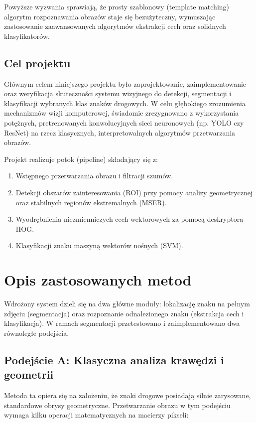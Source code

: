 \documentclass[12pt,a4paper]{article}
\begin{document}
Powyższe wyzwania sprawiają, że prosty szablonowy (template matching) algorytm rozpoznawania obrazów staje się bezużyteczny, wymuszając zastosowanie zaawansowanych algorytmów ekstrakcji cech oraz solidnych klasyfikatorów.

\subsection{Cel projektu}
Głównym celem niniejszego projektu było zaprojektowanie, zaimplementowanie oraz weryfikacja skuteczności systemu wizyjnego do detekcji, segmentacji i klasyfikacji wybranych klas znaków drogowych. W celu głębokiego zrozumienia mechanizmów wizji komputerowej, świadomie zrezygnowano z wykorzystania potężnych, pretrenowanych konwolucyjnych sieci neuronowych (np. YOLO czy ResNet) na rzecz klasycznych, interpretowalnych algorytmów przetwarzania obrazów. 

Projekt realizuje potok (pipeline) składający się z:
\begin{enumerate}
    \item Wstępnego przetwarzania obrazu i filtracji szumów.
    \item Detekcji obszarów zainteresowania (ROI) przy pomocy analizy geometrycznej oraz stabilnych regionów ekstremalnych (MSER).
    \item Wyodrębnienia niezmienniczych cech wektorowych za pomocą deskryptora HOG.
    \item Klasyfikacji znaku maszyną wektorów nośnych (SVM).
\end{enumerate}


\section{Opis zastosowanych metod}
Wdrożony system dzieli się na dwa główne moduły: lokalizację znaku na pełnym zdjęciu (segmentacja) oraz rozpoznanie odnalezionego znaku (ekstrakcja cech i klasyfikacja). W ramach segmentacji przetestowano i zaimplementowano dwa równoległe podejścia.

\subsection{Podejście A: Klasyczna analiza krawędzi i geometrii}
Metoda ta opiera się na założeniu, że znaki drogowe posiadają silnie zarysowane, standardowe obrysy geometryczne. Przetwarzanie obrazu w tym podejściu wymaga kilku operacji matematycznych na macierzy pikseli:
\end{document}
